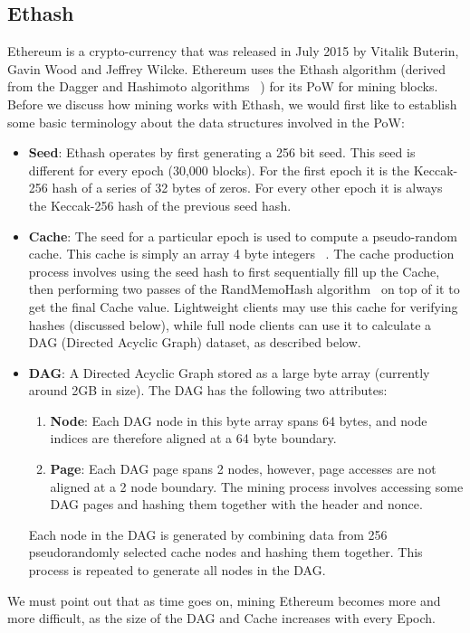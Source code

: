 \documentclass[runningheads]{llncs}
\begin{document}
\subsection{Ethash}
Ethereum is a crypto-currency that was released in July 2015 by Vitalik Buterin, Gavin Wood and Jeffrey Wilcke. Ethereum uses the Ethash algorithm (derived from the Dagger and Hashimoto algorithms ~\cite{dagger-hashimoto}) for its PoW for mining blocks. Before we discuss how mining works with Ethash, we would first like to establish some basic terminology about the data structures involved in the PoW:
\begin{itemize}
\item \textbf{Seed}: Ethash operates by first generating a 256 bit seed. This seed is different for every epoch (30,000 blocks). For the first epoch it is the Keccak-256 hash of a series of 32 bytes of zeros. For every other epoch it is always the Keccak-256 hash of the previous seed hash. 
\item \textbf{Cache}: The seed for a particular epoch is used to compute a pseudo-random cache. This cache is simply an array 4 byte integers ~\cite{Ethmining}. The cache production process involves using the seed hash to first sequentially fill up the Cache, then performing two passes of the RandMemoHash algorithm~\cite{randmemohash} on top of it to get the final Cache value. 
Lightweight clients may use this cache for verifying hashes (discussed below), while full node clients can use it to calculate a DAG (Directed Acyclic Graph) dataset, as described below. 
\item \textbf{DAG}: A Directed Acyclic Graph stored as a large byte array (currently around 2GB in size). The DAG has the following two attributes:
  \begin{enumerate}
  \item \textbf{Node}: Each DAG node in this byte array spans 64 bytes, and node indices are therefore aligned at a 64 byte boundary.
  \item \textbf{Page}: Each DAG page spans 2 nodes, however, page accesses are not aligned at a 2 node boundary. The mining process involves accessing some DAG pages and hashing them together with the header and nonce.
  \end{enumerate}
Each node in the DAG is generated by combining data from 256 pseudorandomly selected cache nodes and hashing them together. This process is repeated to generate all nodes in the DAG.
\end{itemize}
We must point out that as time goes on, mining Ethereum becomes more and more difficult, as the size of the DAG and Cache increases with every Epoch. 
\end{document}

